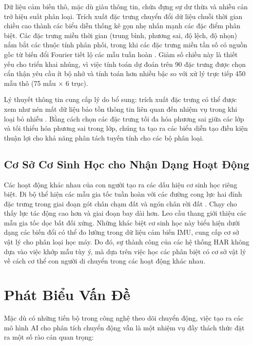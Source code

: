 Dữ liệu cảm biến thô, mặc dù giàu thông tin, chứa đựng sự dư thừa và nhiễu cản trở hiệu suất phân loại. Trích xuất đặc trưng chuyển đổi dữ liệu chuỗi thời gian chiều cao thành các biểu diễn thống kê gọn nhẹ nhấn mạnh các đặc điểm phân biệt. Các đặc trưng miền thời gian (trung bình, phương sai, độ lệch, độ nhọn) nắm bắt các thuộc tính phân phối, trong khi các đặc trưng miền tần số có nguồn gốc từ biến đổi Fourier tiết lộ các mẫu tuần hoàn \cite{oppenheim1999discrete}. Giảm số chiều này là thiết yếu cho triển khai nhúng, vì việc tính toán dự đoán trên 90 đặc trưng được chọn cẩn thận yêu cầu ít bộ nhớ và tính toán hơn nhiều bậc so với xử lý trực tiếp 450 mẫu thô (75 mẫu × 6 trục).

Lý thuyết thông tin cung cấp lý do bổ sung: trích xuất đặc trưng có thể được xem như nén mất dữ liệu bảo tồn thông tin liên quan đến nhiệm vụ trong khi loại bỏ nhiễu \cite{cover2006elements}. Bằng cách chọn các đặc trưng tối đa hóa phương sai giữa các lớp và tối thiểu hóa phương sai trong lớp, chúng ta tạo ra các biểu diễn tạo điều kiện thuận lợi cho khả năng phân tách tuyến tính cho các bộ phân loại.

\subsection{Cơ Sở Cơ Sinh Học cho Nhận Dạng Hoạt Động}

Các hoạt động khác nhau của con người tạo ra các dấu hiệu cơ sinh học riêng biệt. Đi bộ thể hiện các mẫu gia tốc tuần hoàn với các đường cong lực hai đỉnh đặc trưng trong giai đoạn gót chân chạm đất và ngón chân rời đất \cite{whittle2014gait}. Chạy cho thấy lực tác động cao hơn và giai đoạn bay dài hơn. Leo cầu thang giới thiệu các mẫu gia tốc dọc bất đối xứng. Những khác biệt cơ sinh học này biểu hiện dưới dạng các biến đổi có thể đo lường trong dữ liệu cảm biến IMU, cung cấp cơ sở vật lý cho phân loại học máy. Do đó, sự thành công của các hệ thống HAR không dựa vào việc khớp mẫu tùy ý, mà dựa trên việc học các phân biệt có cơ sở vật lý về cách cơ thể con người di chuyển trong các hoạt động khác nhau.

\section{Phát Biểu Vấn Đề}

Mặc dù có những tiến bộ trong công nghệ theo dõi chuyển động, việc tạo ra các mô hình AI cho phân tích chuyển động vẫn là một nhiệm vụ đầy thách thức đặt ra một số rào cản quan trọng:

